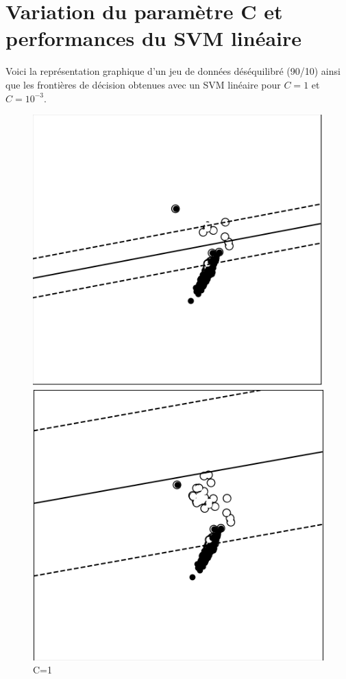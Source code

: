 \documentclass{rapport}
\begin{document}
\section{Variation du paramètre C et performances du SVM linéaire}

Voici la représentation graphique d’un jeu de données déséquilibré (90/10) ainsi que les frontières de décision obtenues avec un SVM linéaire pour $C = 1$ et $C = 10^{-3}$.

\begin{figure}[H]
    \centering
    \begin{minipage}{0.47\linewidth}
        \centering
        \includegraphics[width=\linewidth]{1.PNG}
        \caption*{C=1}
    \end{minipage}\hfill
    \begin{minipage}{0.47\linewidth}
        \centering
        \includegraphics[width=\linewidth]{2.PNG}

\end{minipage}
\end{figure}
\end{document}
